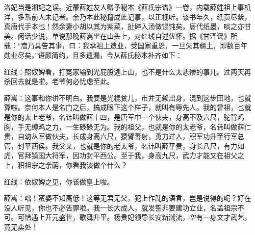 洛妃当是湘妃之误。近蒙薛姓友人赠予秘本《薛氏宗谱》一卷，内载薛姓祖上事机洋，多系前人未记者。余乃本此秘籍成此记事，以正视听。该书年久，纸页尽紫，真唐代手本也！然余妻小胡以其为紫菜，扯碎入汤做馄饨矣。唐代纸墨，啖之亦甘美。闲话少说，单说那晚薛嵩坐在山头上，对红线自述优怀。据《甘泽谣》所载：“嵩乃具告其事，曰：我承祖上遗业，受国家重恩，一旦失其疆土，即数百年勋业尽矣。”语颇简约，且多遗漏，今从薛氏秘本补齐如下： 

红线：照奴婢看，打冤家输到光屁股逃上山，也不是什么太悲惨的事儿。过两天再杀回去就是啦。老爷何必忧虑至此。 

薛嵩：这事和你讲不明白。我要是光棍贫儿，市井无赖出身，混到这步田地，也就算啦。奈何本人是名门之后，搞成眼下这个样子，就叫有辱先人。我的曾祖，也就是你的太上老爷，名讳叫做薛十四，是唐军中一个伙夫，身高不及六尺，驼背鸡胸，手无缚鸡之力，一生碌碌无为。我的祖父，也就是你的太老爷，名讳叫做薛仁贵，自幼从军做伙夫，长成身高六尺，猿臂善射，勇力过人，积军功升至行军总管，封平西侯。我父亲，也就是你的老太爷，名讳叫薛平贵，身长八尺，有力如虎，官拜镇国大将军，因功封平西公。至于我，身高九尺，武力才能又在祖父之上，积祖宗之余荫，你看我该做个什么？ 

红线：依奴婢之见，你该做皇上啦。 

薛嵩：咄！蛮婆不知高低！这等无君无父，犯上作乱的语言，岂是说得的呢？好在没人听见，你也不必告罪啦。我一长大成人，就发誓非要建功立业，名盖祖宗不可。可惜遇上开元盛世，歌舞升平。杨贵妃领导长安新潮流，空有一身文才武艺，竟无卖处！ 

